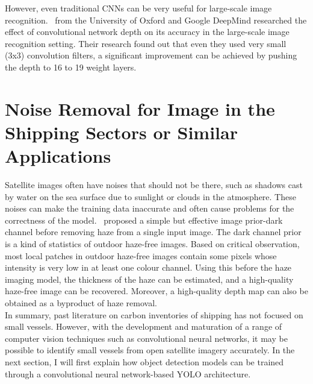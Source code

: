 However, even traditional CNNs can be very useful for large-scale image recognition.~ from the University of Oxford and Google DeepMind researched the effect of convolutional network depth on its accuracy in the large-scale image recognition setting. Their research found out that even they used very small (3x3) convolution filters, a significant improvement can be achieved by pushing the depth to 16 to 19 weight layers.


\section{Noise Removal for Image in the Shipping Sectors or Similar Applications}
Satellite images often have noises that should not be there, such as shadows cast by water on the sea surface due to sunlight or clouds in the atmosphere. These noises can make the training data inaccurate and often cause problems for the correctness of the model.~ proposed a simple but effective image prior-dark channel before removing haze from a single input image. The dark channel prior is a kind of statistics of outdoor haze-free images. Based on critical observation, most local patches in outdoor haze-free images contain some pixels whose intensity is very low in at least one colour channel. Using this before the haze imaging model, the thickness of the haze can be estimated, and a high-quality haze-free image can be recovered. Moreover, a high-quality depth map can also be obtained as a byproduct of haze removal.\\

In summary, past literature on carbon inventories of shipping has not focused on small vessels. However, with the development and maturation of a range of computer vision techniques such as convolutional neural networks, it may be possible to identify small vessels from open satellite imagery accurately. In the next section, I will first explain how object detection models can be trained through a convolutional neural network-based YOLO architecture.